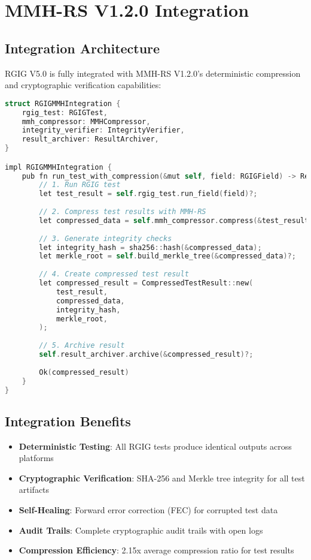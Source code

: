 \documentclass[12pt,a4paper]{article}
\begin{document}
\newpage

\section{MMH-RS V1.2.0 Integration}

\subsection{Integration Architecture}
RGIG V5.0 is fully integrated with MMH-RS V1.2.0's deterministic compression and cryptographic verification capabilities:

\begin{lstlisting}[language=C, caption=MMH-RS Integration Architecture]
struct RGIGMMHIntegration {
    rgig_test: RGIGTest,
    mmh_compressor: MMHCompressor,
    integrity_verifier: IntegrityVerifier,
    result_archiver: ResultArchiver,
}

impl RGIGMMHIntegration {
    pub fn run_test_with_compression(&mut self, field: RGIGField) -> Result<CompressedTestResult> {
        // 1. Run RGIG test
        let test_result = self.rgig_test.run_field(field)?;
        
        // 2. Compress test results with MMH-RS
        let compressed_data = self.mmh_compressor.compress(&test_result.data)?;
        
        // 3. Generate integrity checks
        let integrity_hash = sha256::hash(&compressed_data);
        let merkle_root = self.build_merkle_tree(&compressed_data)?;
        
        // 4. Create compressed test result
        let compressed_result = CompressedTestResult::new(
            test_result,
            compressed_data,
            integrity_hash,
            merkle_root,
        );
        
        // 5. Archive result
        self.result_archiver.archive(&compressed_result)?;
        
        Ok(compressed_result)
    }
}
\end{lstlisting}

\subsection{Integration Benefits}
\begin{itemize}
    \item \textbf{Deterministic Testing}: All RGIG tests produce identical outputs across platforms
    \item \textbf{Cryptographic Verification}: SHA-256 and Merkle tree integrity for all test artifacts
    \item \textbf{Self-Healing}: Forward error correction (FEC) for corrupted test data
    \item \textbf{Audit Trails}: Complete cryptographic audit trails with open logs
    \item \textbf{Compression Efficiency}: 2.15x average compression ratio for test results
\end{itemize}
\end{document}

